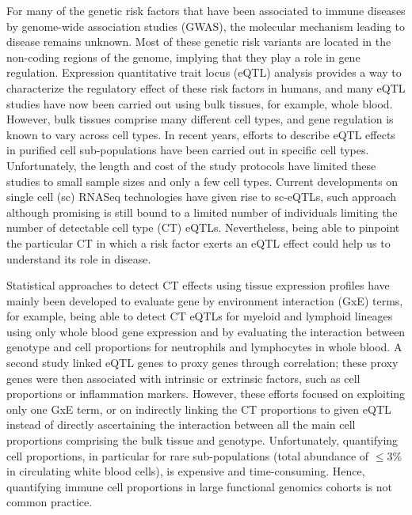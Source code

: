 For many of the genetic risk factors that have been associated to immune diseases by genome-wide association studies (GWAS), the molecular mechanism leading to disease remains unknown\cite{hindorffPotentialEtiologicFunctional2009}. Most of these genetic risk variants are located in the non-coding regions of the genome, implying that they play a role in gene regulation\cite{ionita-lazaSpectralApproachIntegrating2016,javierreLineageSpecificGenomeArchitecture2016}. Expression quantitative trait locus (eQTL) analysis provides a way to characterize the regulatory effect of these risk factors in humans, and many eQTL studies have now been carried out using bulk tissues, for example, whole blood\cite{westraSystematicIdentificationTrans2013,joehanesIntegratedGenomewideAnalysis2017}. However, bulk tissues comprise many different cell types, and gene regulation is known to vary across cell types\cite{rajPolarizationEffectsAutoimmune2014,petersInsightGenotypePhenotypeAssociations2016,naranbhaiGenomicModulatorsGene2015}. In recent years, efforts to describe eQTL effects in purified cell sub-populations have been carried out in specific cell types\cite{chenGeneticDriversEpigenetic2016}. Unfortunately, the length and cost of the study protocols have limited these studies to small sample sizes and only a few cell types. Current developments on single cell (sc) RNASeq technologies have given rise to sc-eQTLs, such approach although promising is still bound to a limited number of individuals limiting the number of detectable cell type (CT) eQTLs. Nevertheless, being able to pinpoint the particular CT in which a risk factor exerts an eQTL effect could help us to understand its role in disease.

Statistical approaches to detect CT effects using tissue expression profiles have mainly been developed to evaluate gene by environment interaction (GxE) terms, for example, being able to detect CT eQTLs for myeloid and lymphoid lineages using only whole blood gene expression and by evaluating the interaction between genotype and cell proportions for neutrophils and lymphocytes in whole blood\cite{westraCellSpecificEQTL2015}. A second study linked eQTL genes to proxy genes through correlation; these proxy genes were then associated with intrinsic or extrinsic factors, such as cell proportions or inflammation markers\cite{zhernakovaIdentificationContextdependentExpression2017}. However, these efforts focused on exploiting only one GxE term, or on indirectly linking the CT proportions to given eQTL instead of directly ascertaining the interaction between all the main cell proportions comprising the bulk tissue and genotype. Unfortunately, quantifying cell proportions, in particular for rare sub-populations (total abundance of $\leq 3\%$ in circulating white blood cells), is expensive and time-consuming. Hence, quantifying immune cell proportions in large functional genomics cohorts is not common practice.

